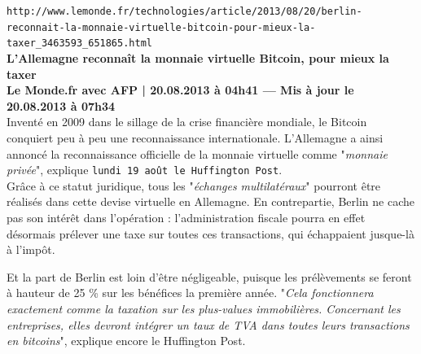 \documentclass[11pt,twoside,a4paper]{article}
\begin{document}
\clearpage

\texttt{http://www.lemonde.fr/technologies/article/2013/08/20/berlin-reconnait-la-monnaie-virtuelle-bitcoin-pour-mieux-la-taxer\_3463593\_651865.html}~\\

\textbf{L'Allemagne reconna{\^i}t la monnaie virtuelle Bitcoin, pour mieux la taxer}~\\

\textbf{\small Le Monde.fr avec AFP | 20.08.2013 {\`a} 04h41 --- Mis {\`a} jour le 20.08.2013 {\`a} 07h34}~\\

	Invent{\'e} en 2009 dans le sillage de la crise financi{\`e}re mondiale, le Bitcoin conquiert peu {\`a} peu une reconnaissance internationale. L'Allemagne a ainsi annonc{\'e} la reconnaissance officielle de la monnaie virtuelle comme "\emph{monnaie priv{\'e}e}", explique \texttt{lundi 19 ao{\^u}t le Huffington Post\footnotemark}. ~\\

	Gr{\^a}ce {\`a} ce statut juridique, tous les "\emph{{\'e}changes multilat{\'e}raux}" pourront {\^e}tre r{\'e}alis{\'e}s dans cette devise virtuelle en Allemagne. En contrepartie, Berlin ne cache pas son int{\'e}r{\^e}t dans l'op{\'e}ration : l'administration fiscale pourra en effet d{\'e}sormais pr{\'e}lever une taxe sur toutes ces transactions, qui {\'e}chappaient jusque-l{\`a} {\`a} l'imp{\^o}t. ~\\

Et la part de Berlin est loin d'{\^e}tre n{\'e}gligeable, puisque les pr{\'e}l{\`e}vements se feront {\`a} hauteur de 25 \% sur les b{\'e}n{\'e}fices la premi{\`e}re ann{\'e}e. "\emph{Cela fonctionnera exactement comme la taxation sur les plus-values immobili{\`e}res. Concernant les entreprises, elles devront int{\'e}grer un taux de TVA dans toutes leurs transactions en bitcoins}", explique encore le Huffington Post. ~\\
\end{document}
